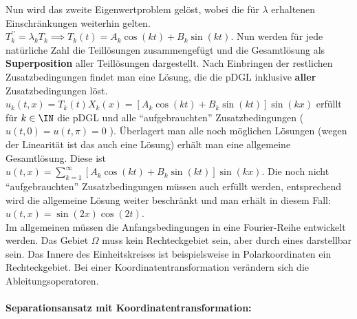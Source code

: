     Nun wird das zweite Eigenwertproblem gelöst, wobei die für {\color{gray}$\lambda$} erhaltenen Einschränkungen weiterhin gelten. {\color{gray}$T_k^{\prime\prime}=\lambda_k T_k \implies T_k(t)=A_k \cos(kt)+B_k\sin(kt)$.} Nun werden für jede natürliche Zahl die Teillösungen zusammengefügt und die Gesamtlösung als \textbf{Superposition} aller Teillösungen dargestellt. Nach Einbringen der restlichen Zusatzbedingungen findet man eine Lösung, die die pDGL inklusive \textbf{aller} Zusatzbedingungen löst. {\color{gray}$u_k(t,x)=T_k(t)X_k(x)=\left[A_k \cos(kt)+B_k\sin(kt)\right]\sin(kx)$ erfüllt für $k\in\IN$ die pDGL und alle \enquote{aufgebrauchten} Zusatzbedingungen ( $u(t, 0)=u(t, \pi)=0$ ). Überlagert man alle noch möglichen Lösungen (wegen der Linearität ist das auch eine Lösung) erhält man eine allgemeine Gesamtlösung. Diese ist $u(t,x)=\sum\limits_{k=1}^\infty\left[A_k \cos(kt)+B_k\sin(kt)\right]\sin(kx)$. Die noch nicht \enquote{aufgebrauchten} Zusatzbedingungen müssen auch erfüllt werden, entsprechend wird die allgemeine Lösung weiter beschränkt und man erhält in diesem Fall: $u(t,x)=\sin(2x)\cos(2t)$.}\\
    Im allgemeinen müssen die Anfangsbedingungen in eine Fourier-Reihe entwickelt werden. Das Gebiet $\Omega$ muss kein Rechteckgebiet sein, aber durch eines darstellbar sein. Das Innere des Einheitskreises ist beispielsweise in Polarkoordinaten ein Rechteckgebiet. Bei einer Koordinatentransformation verändern sich die Ableitungsoperatoren.\\\\
    \textbf{Separationsansatz mit Koordinatentransformation:}\\
